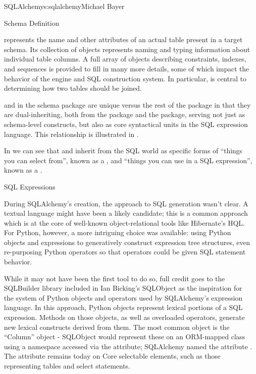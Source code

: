 \begin{aosachapter}{SQLAlchemy}{s:sqlalchemy}{Michael Bayer}
\begin{aosasect1}{Schema Definition}

 represents the name and other attributes of an actual table
present in a target schema.  Its collection of  objects
represents naming and typing information about individual table columns.
A full array of objects describing constraints, indexes, and sequences
is provided to fill in many more details, some of which impact the
behavior of the engine and SQL construction system.  In particular, 
is central to determining how two tables should be joined.

 and  in the schema package are unique versus the rest of the
package in that they are dual-inheriting, both from the  package and
the  package, serving not just as schema-level
constructs, but also as core syntactical units in the SQL expression language.
This relationship is illustrated in .


In  we can see that  and  inherit from the SQL world as
specific forms of ``things you can select from'', known as a ,
and ``things you can use in a SQL expression'', known as a .

\end{aosasect1}

\begin{aosasect1}{SQL Expressions}

During SQLAlchemy's creation, the
approach to SQL generation wasn't clear. A textual
language might have been a likely candidate; this is a common
approach which is at the core of well-known object-relational tools
like Hibernate's HQL. For Python, however, a more intriguing
choice was available: using Python objects and expressions
to generatively construct expression tree structures, even
re-purposing Python operators so that operators
could be given SQL statement behavior.

While it may not have been the first tool to do so, full
credit goes to the SQLBuilder library included in Ian
Bicking's SQLObject as the inspiration for the
system of Python objects and operators used by
SQLAlchemy's expression language. In this approach,
Python objects represent lexical portions of a SQL
expression. Methods on those objects, as well as
overloaded operators, generate new lexical constructs
derived from them. The most common object is the ``Column''
object - SQLObject would represent these on an ORM-mapped
class using a namespace accessed via the  attribute;
SQLAlchemy named the attribute . The 
attribute remains today on Core selectable elements,
such as those representing tables and select statements.


\end{aosasect1}
\end{aosachapter}
